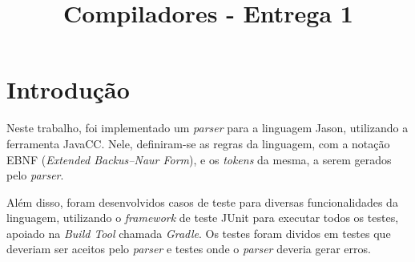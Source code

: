 \documentclass[a4paper,12pt]{article}
\title{Compiladores - Entrega 1}
\begin{document}

\tableofcontents
\clearpage

\section{Introdução}
	Neste trabalho, foi implementado um \textit{parser} para a linguagem Jason, utilizando a ferramenta JavaCC. Nele, definiram-se as regras da linguagem, com a notação EBNF (\textit{Extended Backus–Naur Form}), e os \textit{tokens} da mesma, a serem gerados pelo \textit{parser}.
    
    Além disso, foram desenvolvidos casos de teste para diversas funcionalidades da linguagem, utilizando o \textit{framework} de teste JUnit para executar todos os testes, apoiado na \emph{Build Tool} chamada \emph{Gradle}. Os testes foram dividos em testes que deveriam ser aceitos pelo \emph{parser} e testes onde o \emph{parser} deveria gerar erros.
    
\end{document}
